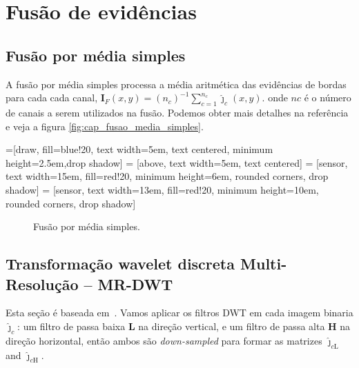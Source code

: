 \chapter{Fusão de evidências} \label{cap_fusao}


\section{Fusão por média simples}
A fusão por média simples processa a média aritmética das evidências de bordas para cada cada canal,
$\bm I_F(x,y)=(n_c)^{-1}\sum_{c=1}^{n_c} \widehat{\bm\jmath}_c(x,y)$.
onde $nc$ é o número de canais a serem utilizados na fusão. Podemos obter mais detalhes na referência \cite{mit} e veja a figura \eqref{fig:cap_fusao_media_simples}.

%
=[draw, fill=blue!20, text width=5em, 
    text centered, minimum height=2.5em,drop shadow]
 = [above, text width=5em, text centered]
 = [sensor, text width=15em, fill=red!20, 
    minimum height=6em, rounded corners, drop shadow]
 = [sensor, text width=13em, fill=red!20, 
    minimum height=10em, rounded corners, drop shadow]
\def\blockdist{2.3}
\def\edgedist{2.5}
	\begin{figure}[htb!]
\centering
{}
	\caption{Fusão por média simples.}
\label{fig:cap_fusao_media_simples}
\end{figure}

\section{Transformação wavelet discreta Multi-Resolução -- MR-DWT} 
Esta seção é baseada em~\cite{n_r}. Vamos aplicar os filtros DWT em cada imagem binaria $\bm{\widehat\jmath}_c$: um filtro de passa baixa $\bm L$  na direção vertical, e um filtro de passa alta $\bm H$ na direção horizontal, então ambos são \textit{down-sampled}  para formar as matrizes $\bm{\widehat\jmath}_{c\text{L}}$ and $\bm{\widehat\jmath}_{c\text{H}}$.  

